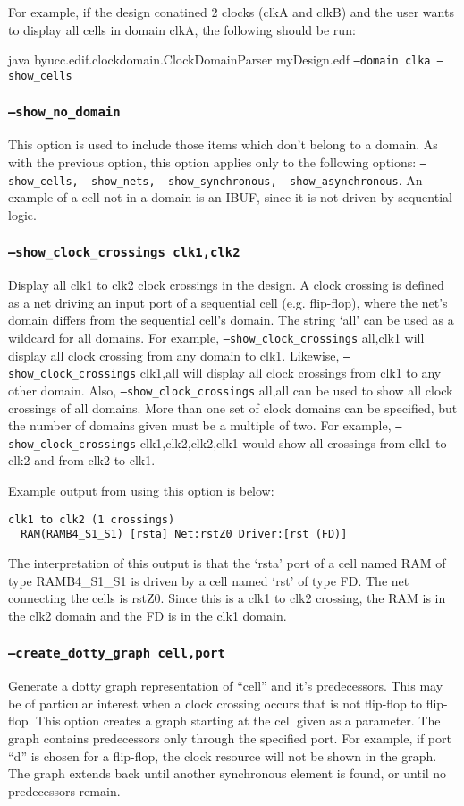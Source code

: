 \documentclass[english]{article}
\begin{document}
For example, if the design conatined 2 clocks (clkA and clkB) and the user wants
to display all cells in domain clkA, the following should be run:

java byucc.edif.clockdomain.ClockDomainParser myDesign.edf \texttt{--domain clka
--show\_cells}

\subsubsection{\texttt{--show\_no\_domain}}
This option is used to include those items which don't belong to a domain. As
with the previous option, this option applies only to the following options:
\texttt{--show\_cells, --show\_nets, --show\_synchronous, --show\_asynchronous}.
An example of a cell not in a domain is an IBUF, since it is not driven by
sequential logic.

\subsubsection{\texttt{--show\_clock\_crossings clk1,clk2}}
Display all clk1 to clk2 clock crossings in the design.  A clock crossing is
defined as a net driving an input port of a sequential cell (e.g. flip-flop), 
where the net's domain differs from the sequential cell's domain.  The string
`all' can be used as a wildcard for all domains.  For example,
\texttt{--show\_clock\_crossings} all,clk1 will display all clock crossing from
any domain to clk1.  Likewise, \texttt{--show\_clock\_crossings} clk1,all will
display all clock crossings from clk1 to any other domain.  Also,
\texttt{--show\_clock\_crossings} all,all can be used to show all clock
crossings of all domains.  More than one set of clock domains can be specified,
but the number of domains given must be a multiple of two.  For example,
\texttt{--show\_clock\_crossings} clk1,clk2,clk2,clk1 would show all crossings
from clk1 to clk2 and from clk2 to clk1.

Example output from using this option is below:
\begin{verbatim}
clk1 to clk2 (1 crossings)
  RAM(RAMB4_S1_S1) [rsta] Net:rstZ0 Driver:[rst (FD)]
\end{verbatim}
The interpretation of this output is that the `rsta' port of a cell named RAM of
type RAMB4\_S1\_S1 is driven by a cell named `rst' of type FD.  The net
connecting the cells is rstZ0. Since this is a clk1 to clk2 crossing, the RAM is
in the clk2 domain and the FD is in the clk1 domain.

\subsubsection{\texttt{--create\_dotty\_graph cell,port}}
Generate a dotty graph representation of ``cell'' and it's predecessors.  This
may be of particular interest when a clock crossing occurs that is not flip-flop
to flip-flop. This option creates a graph starting at the cell given as a
parameter.  The graph contains predecessors only through the specified port. 
For example, if port ``d'' is chosen for a flip-flop, the clock resource will
not be shown in the graph.  The graph extends back until another synchronous
element is found, or until no predecessors remain.
\end{document}
